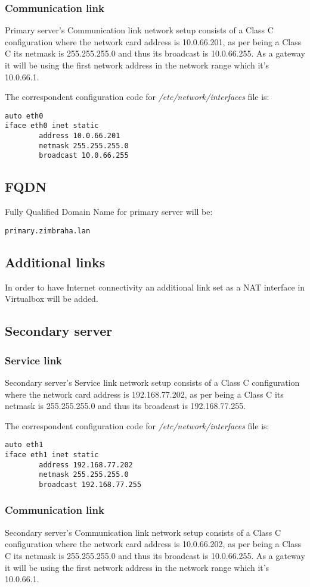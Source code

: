 \subsubsection {Communication link}
Primary server's Communication link network setup consists of a Class C configuration where the network card address is 10.0.66.201, as per being a Class C its netmask is 255.255.255.0 and thus its broadcast is 10.0.66.255. As a gateway it will be using the first network address in the network range which it's 10.0.66.1.


The correspondent configuration code for \textit{/etc/network/interfaces} file is:
\begin{verbatim}
auto eth0
iface eth0 inet static
        address 10.0.66.201
        netmask 255.255.255.0
        broadcast 10.0.66.255
\end{verbatim}
\subsection {FQDN}
Fully Qualified Domain Name for primary server will be:
\begin{verbatim}
primary.zimbraha.lan
\end{verbatim}
\subsection {Additional links}
In order to have Internet connectivity an additional link set as a NAT interface in Virtualbox will be added.

\subsection {Secondary server}
\subsubsection {Service link}
Secondary server's Service link network setup consists of a Class C configuration where the network card address is 192.168.77.202, as per being a Class C its netmask is 255.255.255.0 and thus its broadcast is 192.168.77.255.

The correspondent configuration code for \textit{/etc/network/interfaces} file is:
\begin{verbatim}
auto eth1
iface eth1 inet static
        address 192.168.77.202
        netmask 255.255.255.0
        broadcast 192.168.77.255
\end{verbatim}

\subsubsection {Communication link}
Secondary server's Communication link network setup consists of a Class C configuration where the network card address is 10.0.66.202, as per being a Class C its netmask is 255.255.255.0 and thus its broadcast is 10.0.66.255. As a gateway it will be using the first network address in the network range which it's 10.0.66.1.

